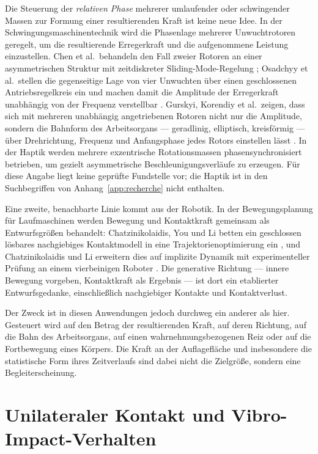 \documentclass[12pt,a4paper]{report}
\begin{document}
Die Steuerung der \emph{relativen Phase} mehrerer umlaufender oder
schwingender Massen zur Formung einer resultierenden Kraft ist keine neue
Idee. In der Schwingungsmaschinentechnik wird die Phasenlage mehrerer
Unwuchtrotoren geregelt, um die resultierende Erregerkraft und die
aufgenommene Leistung einzustellen. Chen et al.\ behandeln den Fall
zweier Rotoren an einer asymmetrischen Struktur mit zeitdiskreter
Sliding-Mode-Regelung \cite{chen2019}; Osadchyy et al.\ stellen die
gegenseitige Lage von vier Unwuchten über einen geschlossenen
Antriebsregelkreis ein und machen damit die Amplitude der Erregerkraft
unabhängig von der Frequenz verstellbar \cite{osadchyy2023}. Gurskyi,
Korendiy et al.\ zeigen, dass sich mit mehreren unabhängig
angetriebenen Rotoren nicht nur die Amplitude, sondern die Bahnform
des Arbeitsorgans --- geradlinig, elliptisch, kreisförmig --- über
Drehrichtung, Frequenz und Anfangsphase jedes Rotors einstellen lässt
\cite{gurskyi2023}. In der Haptik werden mehrere exzentrische
Rotationsmassen phasensynchronisiert betrieben, um gezielt
asymmetrische Beschleunigungsverläufe zu erzeugen. Für diese Angabe
liegt keine geprüfte Fundstelle vor; die Haptik ist in den Suchbegriffen
von Anhang~\ref{app:recherche} nicht enthalten.

Eine zweite, benachbarte Linie kommt aus der Robotik. In der
Bewegungsplanung für Laufmaschinen werden Bewegung und Kontaktkraft
gemeinsam als Entwurfsgrößen behandelt: Chatzinikolaidis, You und Li
betten ein geschlossen lösbares nachgiebiges Kontaktmodell in eine
Trajektorienoptimierung ein \cite{chatzinikolaidis2020}, und
Chatzinikolaidis und Li erweitern dies auf implizite Dynamik mit
experimenteller Prüfung an einem vierbeinigen Roboter
\cite{chatzinikolaidis2021}. Die generative Richtung --- innere
Bewegung vorgeben, Kontaktkraft als Ergebnis --- ist dort ein
etablierter Entwurfsgedanke, einschließlich nachgiebiger Kontakte und
Kontaktverlust.

Der Zweck ist in diesen Anwendungen jedoch durchweg ein anderer als hier.
Gesteuert wird auf den Betrag der resultierenden Kraft, auf deren
Richtung, auf die Bahn des Arbeitsorgans, auf einen
wahrnehmungsbezogenen Reiz oder auf die Fortbewegung eines Körpers. Die Kraft an der
Auflagefläche und insbesondere die statistische Form ihres Zeitverlaufs
sind dabei nicht die Zielgröße, sondern eine Begleiterscheinung.

\section{Unilateraler Kontakt und Vibro-\allowbreak Impact-Verhalten}
\label{sec:stand-kontakt}
\end{document}
